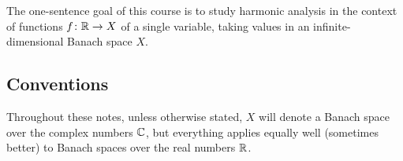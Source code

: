 The one-sentence goal of this course is to study harmonic analysis in the context of functions $f \colon \mathbb{R} \rightarrow X$ of a single variable, taking values in an infinite-dimensional Banach space $X$.


\subsection{Conventions}
Throughout these notes, unless otherwise stated, $X$ will denote a Banach space over the complex numbers $\mathbb{C}$, but everything applies equally well (sometimes better) to Banach spaces over the real numbers $\mathbb{R}$.





